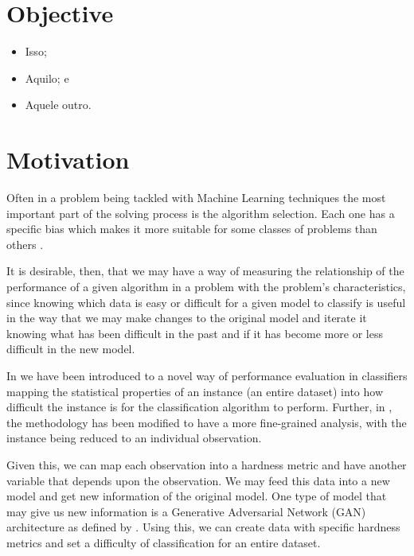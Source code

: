 \section{Objective}

\begin{itemize}
\item Isso;
\item Aquilo; e
\item Aquele outro.
\end{itemize}

\section{Motivation}
Often in a problem being tackled with Machine Learning techniques the most important part of the solving process is the algorithm selection. Each one has a specific bias which makes it more suitable for some classes of problems than others \cite{Lorena2022}. 

It is desirable, then, that we may have a way of measuring the relationship of the performance of a given algorithm in a problem with the problem's characteristics, since knowing which data is easy or difficult for a given model to classify is useful in the way that we may make changes to the original model and iterate it knowing what has been difficult in the past and if it has become more or less difficult in the new model.

In \cite{Munoz2018} we have been introduced to a novel way of performance evaluation in classifiers mapping the statistical properties of an instance (an entire dataset) into how difficult the instance is for the classification algorithm to perform. Further, in \cite{Lorena2022}, the methodology has been modified to have a more fine-grained analysis, with the instance being reduced to an individual observation.

Given this, we can map each observation into a hardness metric and have another variable that depends upon the observation. We may feed this data into a new model and get new information of the original model. One type of model that may give us new information is a Generative Adversarial Network (GAN) architecture as defined by \cite{Goodfellow2014}. Using this, we can create data with specific hardness metrics and set a difficulty of classification for an entire dataset.



